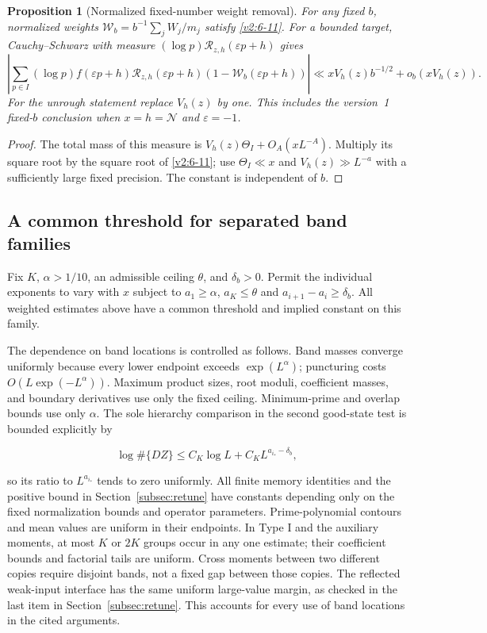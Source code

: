 \documentclass[11pt]{article}
\newtheorem{proposition}[theorem]{Proposition}
\theoremstyle{definition}
\newcommand{\GN}{\mathcal N}
\theoremstyle{remark}
\numberwithin{equation}{section}
\begin{document}
\begin{proposition}[Normalized fixed-number weight removal]\label{prop:weights}
For any fixed $b$, normalized weights
$\mathcal W_b=b^{-1}\sum_j W_j/m_j$ satisfy
\eqref{v2:6-11}. For a bounded target, Cauchy--Schwarz with
measure $(\log p)\mathcal R_{z,h}(\varepsilon p+h)$ gives
\begin{equation}\label{eq:weight-removal}
 \left|\sum_{p\in I}(\log p)f(\varepsilon p+h)
 \mathcal R_{z,h}(\varepsilon p+h)(1-\mathcal W_b(\varepsilon p+h))\right|
 \ll xV_h(z)b^{-1/2}+o_b(xV_h(z)).
\end{equation}
For the unrough statement replace $V_h(z)$ by one. This includes
the version~1 fixed-$b$ conclusion when $x=h=\GN$ and
$\varepsilon=-1$.
\end{proposition}
\begin{proof}
The total mass of this measure is
$V_h(z)\Theta_I+O_A(xL^{-A})$. Multiply its square root by
the square root of \eqref{v2:6-11}; use
$\Theta_I\ll x$ and $V_h(z)\gg L^{-a}$ with a sufficiently
large fixed precision. The constant is independent of $b$.
\end{proof}
\subsection{A common threshold for separated band families}\label{subsec:band-uniform}
Fix $K$, $\alpha>1/10$, an admissible ceiling $\theta$, and $\delta_b>0$. Permit the individual exponents to vary with $x$ subject to $a_1\ge\alpha$, $a_K\le\theta$ and $a_{i+1}-a_i\ge\delta_b$. All weighted estimates above have a common threshold and implied constant on this family.

The dependence on band locations is controlled as follows. Band masses converge uniformly because every lower endpoint exceeds $\exp(L^\alpha)$; puncturing costs $O(L\exp(-L^\alpha))$. Maximum product sizes, root moduli, coefficient masses, and boundary derivatives use only the fixed ceiling. Minimum-prime and overlap bounds use only $\alpha$. The sole hierarchy comparison in the second good-state test is bounded explicitly by


\begin{equation}
\log\#\{DZ\}\le C_K\log L+C_K L^{a_{i_*}-\delta_b},
\end{equation}


so its ratio to $L^{a_{i_*}}$ tends to zero uniformly. All finite memory identities and the positive bound in Section~\ref{subsec:retune} have constants depending only on the fixed normalization bounds and operator parameters. Prime-polynomial contours and mean values are uniform in their endpoints. In Type I and the auxiliary moments, at most $K$ or $2K$ groups occur in any one estimate; their coefficient bounds and factorial tails are uniform. Cross moments between two different copies require disjoint bands, not a fixed gap between those copies. The reflected weak-input interface has the same uniform large-value margin, as checked in the last item in Section~\ref{subsec:retune}. This accounts for every use of band locations in the cited arguments.
\end{document}
